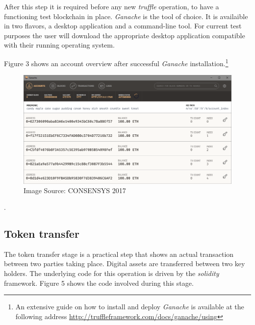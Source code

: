 \documentclass[submission,copyright,creativecommons]{eptcs}
\begin{document}
After this step it is required before any new \textit{truffle} operation, to have a functioning test blockchain in place.  \textit{Ganache} is the tool of choice.  It is availaible in two flavors, a desktop application and a command-line tool.  For current test purposes the user will download the appropriate desktop application compatible with their running operating system. 

Figure 3 shows an account overview after successful \textit{Ganache} installation.\footnote{An extensive guide on how to install and deploy \textit{Ganache} is available at the following address \url{http://truffleframework.com/docs/ganache/using}}
\begin{figure}[h]
    \centering
    \label{fig:my_label}
    \includegraphics[width=5in]{ganache_accounts.png}
     \caption{Image Source: CONSENSYS 2017}
\end{figure}.

\subsection{Token transfer}
The token transfer stage is a practical step that shows an actual transaction between two parties taking place.  Digital assets are transferred between two key holders.  The underlying code for this operation is driven by the \textit{solidity} framework. Figure 5 shows the code involved during this stage.




\newpage


\begin{multicols}{2}

\end{multicols}
\end{document}
